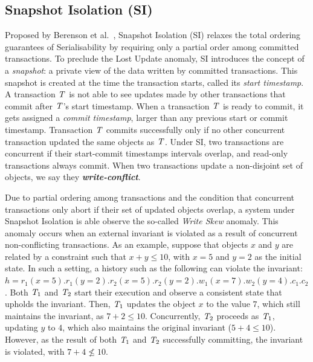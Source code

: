 \subsection{Snapshot Isolation (SI)}
\label{sect:si}

Proposed by Berenson et al.~\citep{sql-critique}, Snapshot Isolation (SI) relaxes the total ordering guarantees of Serialisability by requiring only a partial order among committed transactions. To preclude the Lost Update anomaly, SI introduces the concept of a \emph{snapshot}: a private view of the data written by committed transactions. This snapshot is created at the time the transaction starts, called its \emph{start timestamp}. A transaction $\mathit{T}$ is not able to see updates made by other transactions that commit after $\mathit{T}$'s start timestamp. When a transaction $\mathit{T}$ is ready to commit, it gets assigned a \emph{commit timestamp}, larger than any previous start or commit timestamp. Transaction $\mathit{T}$ commits successfully only if no other concurrent transaction updated the same objects as $\mathit{T}$. Under SI, two transactions are concurrent if their start-commit timestamps intervals overlap, and read-only transactions always commit. When two transactions update a non-disjoint set of objects, we say they \textbf{\em write-conflict}.

Due to partial ordering among transactions and the condition that concurrent transactions only abort if their set of updated objects overlap, a system under Snapshot Isolation is able observe the so-called \emph{Write Skew} anomaly. This anomaly occurs when an external invariant is violated as a result of concurrent non-conflicting transactions. As an example, suppose that objects $x$ and $y$ are related by a constraint such that $x + y \le 10$, with $x = 5$ and $y = 2$ as the initial state. In such a setting, a history such as the following can violate the invariant: $h = r_1(x=5).r_1(y=2).r_2(x=5).r_2(y=2).w_1(x=7).w_2(y=4).c_1.c_2$. Both $\mathit{T}_1$ and $\mathit{T}_2$ start their execution and observe a consistent state that upholds the invariant. Then, $\mathit{T}_1$ updates the object $x$ to the value $7$, which still maintains the invariant, as $7 + 2 \le 10$. Concurrently, $\mathit{T}_2$ proceeds as $\mathit{T}_1$, updating $y$ to $4$, which also maintains the original invariant ($5 + 4 \le 10$). However, as the result of both $\mathit{T}_1$ and $\mathit{T}_2$ successfully committing, the invariant is violated, with $7 + 4 \not\le 10$.


